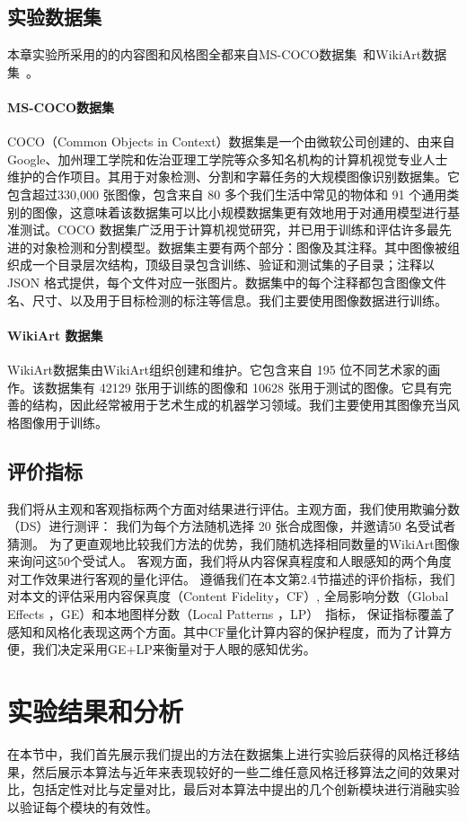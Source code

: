 \subsection{实验数据集}
本章实验所采用的的内容图和风格图全都来自MS-COCO数据集~\cite{lin2014microsoft}和WikiArt数据集~\cite{wikiart2018}。
\paragraph{MS-COCO数据集}
COCO（Common Objects in Context）数据集是一个由微软公司创建的、由来自 Google、加州理工学院和佐治亚理工学院等众多知名机构的计算机视觉专业人士维护的合作项目。其用于对象检测、分割和字幕任务的大规模图像识别数据集。它包含超过330,000 张图像，包含来自 80 多个我们生活中常见的物体和 91 个通用类别的图像，这意味着该数据集可以比小规模数据集更有效地用于对通用模型进行基准测试。COCO 数据集广泛用于计算机视觉研究，并已用于训练和评估许多最先进的对象检测和分割模型。数据集主要有两个部分：图像及其注释。其中图像被组织成一个目录层次结构，顶级目录包含训练、验证和测试集的子目录；注释以 JSON 格式提供，每个文件对应一张图片。数据集中的每个注释都包含图像文件名、尺寸、以及用于目标检测的标注等信息。我们主要使用图像数据进行训练。
\paragraph{WikiArt 数据集}
WikiArt数据集由WikiArt组织创建和维护。它包含来自 195 位不同艺术家的画作。该数据集有 42129 张用于训练的图像和 10628 张用于测试的图像。它具有完善的结构，因此经常被用于艺术生成的机器学习领域。我们主要使用其图像充当风格图像用于训练。

\subsection{评价指标}
我们将从主观和客观指标两个方面对结果进行评估。主观方面，我们使用欺骗分数（DS）进行测评：
我们为每个方法随机选择 20 张合成图像，并邀请50 名受试者猜测。
为了更直观地比较我们方法的优势，我们随机选择相同数量的WikiArt图像来询问这50个受试人。
客观方面，我们将从内容保真程度和人眼感知的两个角度对工作效果进行客观的量化评估。
遵循我们在本文第2.4节描述的评价指标，我们对本文的评估采用内容保真度（Content Fidelity，CF）, 
全局影响分数（Global Effects ，GE）和本地图样分数（Local Patterns ，LP）~\cite{wang2021evaluate}指标，
保证指标覆盖了感知和风格化表现这两个方面。其中CF量化计算内容的保护程度，而为了计算方便，我们决定采用GE+LP来衡量对于人眼的感知优劣。

\section{实验结果和分析}
在本节中，我们首先展示我们提出的方法在数据集上进行实验后获得的风格迁移结果，然后展示本算法与近年来表现较好的一些二维任意风格迁移算法之间的效果对比，包括定性对比与定量对比，最后对本算法中提出的几个创新模块进行消融实验以验证每个模块的有效性。
